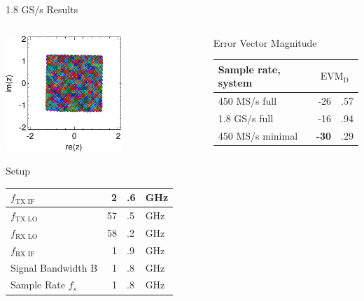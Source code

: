 \documentclass[10pt]{beamer}
\newcommand{\mc}[2]{\multicolumn{#1}{c|}{#2}}
\begin{document}
\begin{frame}{1.8 GS/s Results}
  \begin{columns}[T]
    \begin{column}{.5\textwidth}
      \includegraphics[width=0.6\textwidth]{figures/matlab/res_450_qam256_cp_corr_pcorr_initial}
      \begin{block}{Setup}
        \begin{tabular}{|l|r@{}l@{~}l|}
          \hline
          $f_{\text{TX IF}}$ & 2&.6&GHz \\ \hline
          $f_{\text{TX LO}}$ & 57&.5&GHz \\ \hline
          $f_{\text{RX LO}}$ & 58&.2&GHz \\ \hline
          $f_{\text{RX IF}}$ & 1&.9&GHz \\ \hline
          Signal Bandwidth B & 1&.8&GHz \\ \hline
          Sample Rate $f_s$ & 1&.8&GHz \\ \hline
        \end{tabular}
      \end{block}
    \end{column}
    \begin{column}{.5\textwidth}
      \begin{block}{Error Vector Magnitude}
        \begin{tabular}{|l|r@{}l|}
          \hline
          Sample rate, system             & \mc{2}{$\text{EVM}_\text{D}$} \\ \hline
          450 MS/s full                   & -26&.57      \\ \hline
          1.8 GS/s full                   & -16&.94      \\ \hline
          450 MS/s minimal                & {\bf-30}&.29 \\ \hline

\end{tabular}
\end{block}
\end{column}
\end{columns}
\end{frame}
\end{document}
